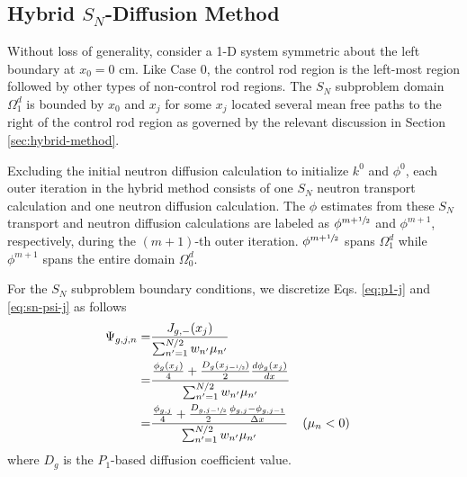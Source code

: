 \subsection{Hybrid $S_N$-Diffusion Method}

Without loss of generality, consider a 1-D system symmetric about the left boundary at $x_0=0$ cm.
Like Case 0, the control rod region is the left-most region followed by other types of non-control
rod regions. The $S_N$ subproblem domain $\Omega^d_1$ is bounded by $x_0$ and $x_j$ for some $x_j$
located several mean free paths to the right of the control rod region as governed by the relevant
discussion in Section \ref{sec:hybrid-method}.

Excluding the initial neutron diffusion calculation to initialize $k^0$ and $\phi^0$, each outer
iteration in the hybrid method consists of one $S_N$ neutron transport calculation and one neutron
diffusion calculation. The $\phi$ estimates from these $S_N$ transport and neutron diffusion
calculations are labeled as $\phi^{m+\sfrac{1}{2}}$ and $\phi^{m+1}$, respectively, during the
$(m+1)$-th outer iteration. $\phi^{m+\sfrac{1}{2}}$ spans $\Omega^d_1$ while $\phi^{m+1}$ spans
the entire domain $\Omega^d_0$.

For the $S_N$ subproblem boundary conditions, we discretize Eqs. \ref{eq:p1-j} and
\ref{eq:sn-psi-j} as follows
%
\begin{align}
  \Psi_{g,j,n} =& \frac{J_{g,-}(x_j)}{\sum^{N/2}_{n'=1}w_{n'}\mu_{n'}} \nonumber \\
  =& \frac{\frac{\phi_g(x_j)}{4}+
  \frac{D_g(x_{j-\sfrac{1}{2}})}{2}\frac{d\phi_g(x_j)}{dx}}{\sum^{N/2}_{n'=1}w_{n'}\mu_{n'}}
  \nonumber \\
  =& \frac{\frac{\phi_{g,j}}{4}+
  \frac{D_{g,j-\sfrac{1}{2}}}{2}\frac{\phi_{g,j}-\phi_{g,j-1}}{\Delta x}}
    {\sum^{N/2}_{n'=1}w_{n'}\mu_{n'}} && (\mu_n < 0) \label{eq:sn-bc}
\end{align}
%
where $D_g$ is the $P_1$-based diffusion coefficient value.

